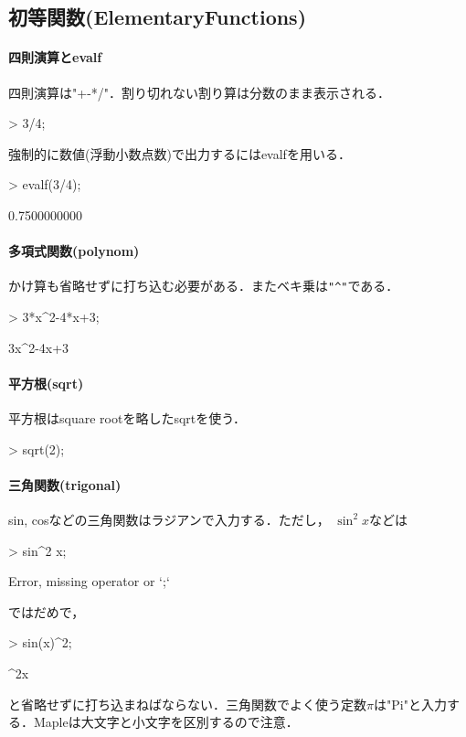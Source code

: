\subsection{初等関数(ElementaryFunctions)}
\paragraph{四則演算とevalf}
四則演算は"+-*/"．割り切れない割り算は分数のまま表示される．
\begin{MapleInput}
> 3/4;
\end{MapleInput}
\begin{MapleOutput}
\end{MapleOutput}
強制的に数値(浮動小数点数)で出力するにはevalfを用いる．
\begin{MapleInput}
> evalf(3/4);
\end{MapleInput}
\begin{MapleOutput}
0.7500000000
\end{MapleOutput}
\paragraph{多項式関数(polynom)}
かけ算も省略せずに打ち込む必要がある．またベキ乗は\verb="^"=である．
\begin{MapleInput}
> 3*x^2-4*x+3;
\end{MapleInput}
\begin{MapleOutput}
3x^2-4x+3
\end{MapleOutput}
\paragraph{平方根(sqrt)}
平方根はsquare rootを略したsqrtを使う．
\begin{MapleInput}
> sqrt(2);
\end{MapleInput}
\begin{MapleOutput}
\end{MapleOutput}

\paragraph{三角関数(trigonal)}
sin, cosなどの三角関数はラジアンで入力する．ただし， $\sin^2x$などは
\begin{MapleInput}
> sin^2 x;
\end{MapleInput}
\begin{MapleError}
Error, missing operator or `;`
\end{MapleError}
ではだめで，
\begin{MapleInput}
> sin(x)^2;
\end{MapleInput}
\begin{MapleOutput}
\sin^2x
\end{MapleOutput}
と省略せずに打ち込まねばならない．三角関数でよく使う定数$\pi$は"Pi"と入力する．Mapleは大文字と小文字を区別するので注意．

